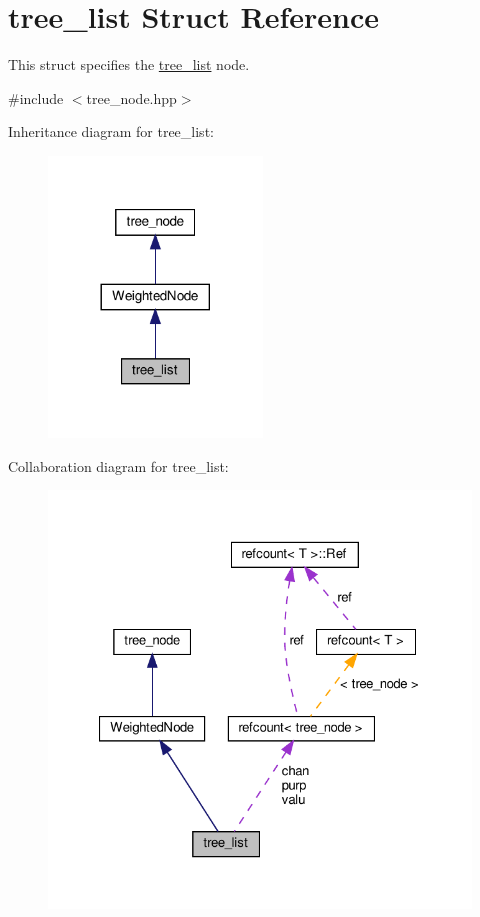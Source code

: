 \hypertarget{structtree__list}{}\section{tree\+\_\+list Struct Reference}
\label{structtree__list}


This struct specifies the \hyperlink{structtree__list}{tree\+\_\+list} node.  




{\ttfamily \#include $<$tree\+\_\+node.\+hpp$>$}



Inheritance diagram for tree\+\_\+list\+:
\nopagebreak
\begin{figure}[H]
\begin{center}
\leavevmode
\includegraphics[width=161pt]{d8/de3/structtree__list__inherit__graph}
\end{center}
\end{figure}


Collaboration diagram for tree\+\_\+list\+:
\nopagebreak
\begin{figure}[H]
\begin{center}
\leavevmode
\includegraphics[width=327pt]{d8/d00/structtree__list__coll__graph}
\end{center}
\end{figure}
